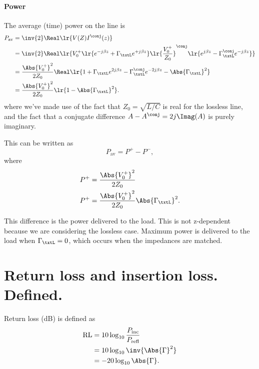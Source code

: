 \paragraph{Power}
The average (time) power on the line is
\begin{equation}\label{eqn:uwaves4TransmissionLines:1000}
\begin{aligned}
P_{ \textrm{av}}
&= \inv{2} \Real\lr{ V(Z) I^\conj(z) }
\\ &=
\inv{2} \Real
\lr{
V_0^{+} \lr{ e^{-j \beta z} + \Gamma_\txtL e^{+j \beta z} }
\lr{\frac{V_0^{+}}{Z_0}}^\conj \lr{ e^{j \beta z} - \Gamma_\txtL^\conj e^{-j \beta z} }
}
\\ &= \frac{ \Abs{V_0^{+}}^2 }{2 Z_0 } \Real\lr{
1 + \Gamma_\txtL e^{2 j \beta z} - \Gamma_\txtL^\conj e^{-2 j \beta z} - \Abs{\Gamma_\txtL}^2
}
\\ &= \frac{ \Abs{V_0^{+}}^2 }{2 Z_0 } \lr{
1 - \Abs{\Gamma_\txtL}^2
}.
\end{aligned}
\end{equation}
where we've made use of the fact that \( Z_0 = \sqrt{L/C} \) is real for the lossless line, and the fact that a conjugate difference \( A - A^\conj = 2 j \Imag(A) \) is purely imaginary.

This can be written as
\begin{equation}\label{eqn:uwaves4TransmissionLines:1020}
P_{ \textrm{av}} = P^{+} - P^{-},
\end{equation}
where
\begin{equation}\label{eqn:uwaves4TransmissionLines:1040}
\begin{aligned}
P^{+} &= \frac{ \Abs{V_0^{+}}^2 }{2 Z_0 } \\
P^{+} &= \frac{ \Abs{V_0^{+}}^2 }{2 Z_0 } \Abs{\Gamma_\txtL}^2.
\end{aligned}
\end{equation}

This difference is the power delivered to the load.  This is not z-dependent because we are considering the lossless case.  Maximum power is delivered to the load when \( \Gamma_\txtL = 0 \), which occurs when the impedances are matched.
\section{Return loss and insertion loss.  Defined.}
Return loss (dB) is defined as
\begin{equation}\label{eqn:uwaves4TransmissionLines:1060}
\begin{aligned}
\textrm{RL}
&= 10 \log_{10} \frac{P_{\textrm{inc}}}{P_{\textrm{refl}}}
\\ &= 10 \log_{10} \inv{\Abs{\Gamma}^2}
\\ &= -20 \log_{10} \Abs{\Gamma}.
\end{aligned}
\end{equation}

